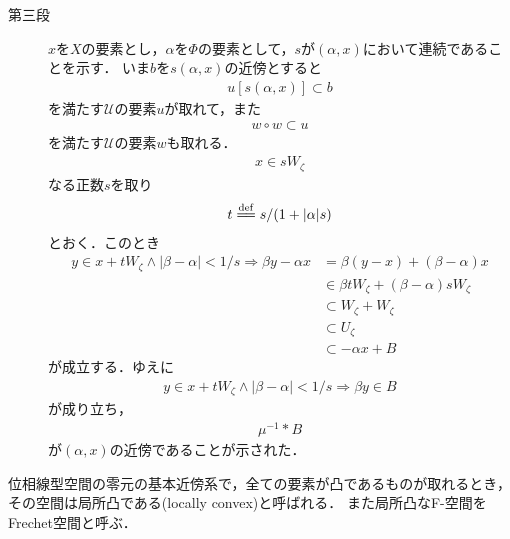 \begin{sketch}
\begin{description}
			\item[第三段]
				$x$を$X$の要素とし，$\alpha$を$\Phi$の要素として，$s$が$(\alpha,x)$において連続であることを示す．
				いま$b$を$s(\alpha,x)$の近傍とすると
				\begin{align}
					u[s(\alpha,x)] \subset b
				\end{align}
				を満たす$\mathscr{U}$の要素$u$が取れて，また
				\begin{align}
					w \circ w \subset u
				\end{align}
				を満たす$\mathscr{U}$の要素$w$も取れる．
				\begin{align}
					x \in s W_\zeta
				\end{align}
				なる正数$s$を取り
				\begin{align}
					t \defeq s/(1+|\alpha|s)
				\end{align}
				とおく．このとき
				\begin{align}
					y \in x+t W_\zeta \wedge |\beta - \alpha| < 1/s
					\Longrightarrow \beta y - \alpha x
					&= \beta (y-x) + (\beta - \alpha)x \\
					&\in \beta t W_\zeta + (\beta - \alpha) s W_\zeta \\
					&\subset W_\zeta + W_\zeta \\
					&\subset U_\zeta \\
					&\subset -\alpha x + B
				\end{align}
				が成立する．ゆえに
				\begin{align}
					y \in x+t W_\zeta \wedge |\beta - \alpha| < 1/s
					\Longrightarrow \beta y \in B
				\end{align}
				が成り立ち，
				\begin{align}
					\mu^{-1} \ast B
				\end{align}
				が$(\alpha,x)$の近傍であることが示された．
				
		\end{description}
	\end{sketch}
	
	\begin{screen}
		\begin{dfn}
			位相線型空間の零元の基本近傍系で，全ての要素が凸であるものが取れるとき，
			その空間は局所凸である(locally convex)と呼ばれる．
			また局所凸なF-空間をFrechet空間と呼ぶ．
		\end{dfn}
	\end{screen}
	
	\begin{screen}
		\begin{thm}[局所凸空間とはセミノルムの族で生成される空間]
			
		\end{thm}
	\end{screen}